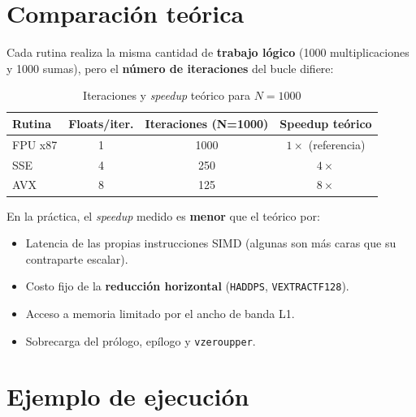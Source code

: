 \documentclass[12pt, letterpaper]{article}
\begin{document}
\section{Comparación teórica}

Cada rutina realiza la misma cantidad de \textbf{trabajo lógico} (1000 multiplicaciones y 1000 sumas), pero el \textbf{número de iteraciones} del bucle difiere:

\begin{table}[H]
    \centering
    \begin{tabular}{@{}lccc@{}}
        \toprule
        \textbf{Rutina} & \textbf{Floats/iter.} & \textbf{Iteraciones (N=1000)} & \textbf{Speedup teórico} \\
        \midrule
        FPU x87 & 1 & 1000 & $1\times$ (referencia) \\
        SSE     & 4 & 250  & $4\times$ \\
        AVX     & 8 & 125  & $8\times$ \\
        \bottomrule
    \end{tabular}
    \caption{Iteraciones y \textit{speedup} teórico para $N=1000$}
\end{table}

En la práctica, el \textit{speedup} medido es \textbf{menor} que el teórico por:
\begin{itemize}
    \item Latencia de las propias instrucciones SIMD (algunas son más caras que su contraparte escalar).
    \item Costo fijo de la \textbf{reducción horizontal} (\texttt{HADDPS}, \texttt{VEXTRACTF128}).
    \item Acceso a memoria limitado por el ancho de banda L1.
    \item Sobrecarga del prólogo, epílogo y \texttt{vzeroupper}.
\end{itemize}

\section{Ejemplo de ejecución}
\end{document}
